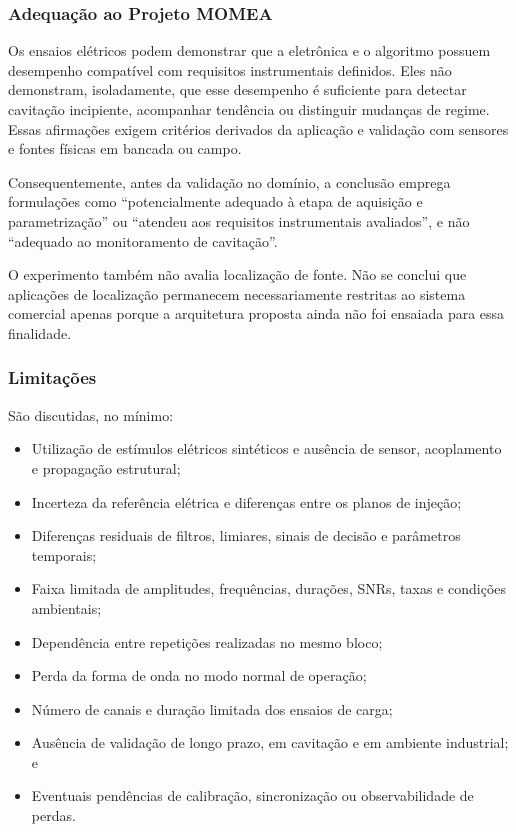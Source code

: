 \subsubsection{Adequação ao Projeto MOMEA}

Os ensaios elétricos podem demonstrar que a eletrônica e o algoritmo possuem desempenho compatível com requisitos instrumentais definidos. Eles não demonstram, isoladamente, que esse desempenho é suficiente para detectar cavitação incipiente, acompanhar tendência ou distinguir mudanças de regime. Essas afirmações exigem critérios derivados da aplicação e validação com sensores e fontes físicas em bancada ou campo.

Consequentemente, antes da validação no domínio, a conclusão emprega formulações como ``potencialmente adequado à etapa de aquisição e parametrização'' ou ``atendeu aos requisitos instrumentais avaliados'', e não ``adequado ao monitoramento de cavitação''.

O experimento também não avalia localização de fonte. Não se conclui que aplicações de localização permanecem necessariamente restritas ao sistema comercial apenas porque a arquitetura proposta ainda não foi ensaiada para essa finalidade.

\subsubsection{Limitações}
São discutidas, no mínimo:
\begin{itemize}
	\item Utilização de estímulos elétricos sintéticos e ausência de sensor, acoplamento e propagação estrutural;
	
	\item Incerteza da referência elétrica e diferenças entre os planos de injeção;
	
	\item Diferenças residuais de filtros, limiares, sinais de decisão e parâmetros temporais;
	
	\item Faixa limitada de amplitudes, frequências, durações, SNRs, taxas e condições ambientais;
	
	\item Dependência entre repetições realizadas no mesmo bloco; 
	
	\item Perda da forma de onda no modo normal de operação;
	
	\item Número de canais e duração limitada dos ensaios de carga;
	
	\item Ausência de validação de longo prazo, em cavitação e em ambiente industrial; e
	
	\item Eventuais pendências de calibração, sincronização ou observabilidade de perdas.
\end{itemize}

